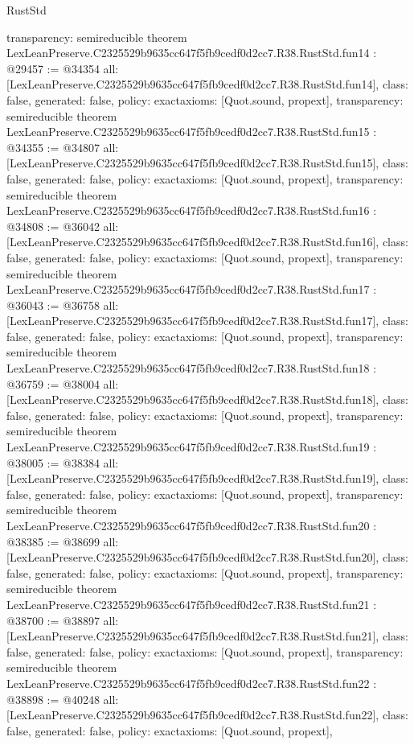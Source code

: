\begin{lexlean}{RustStd}
\begin{coremodule}
{  transparency: semireducible
}
theorem LexLeanPreserve.C2325529b9635cc647f5fb9cedf0d2cc7.R38.RustStd.fun14 : @29457 := @34354 {
  all: [LexLeanPreserve.C2325529b9635cc647f5fb9cedf0d2cc7.R38.RustStd.fun14],
  class: false,
  generated: false,
  policy: exact{axioms: [Quot.sound, propext]},
  transparency: semireducible
}
theorem LexLeanPreserve.C2325529b9635cc647f5fb9cedf0d2cc7.R38.RustStd.fun15 : @34355 := @34807 {
  all: [LexLeanPreserve.C2325529b9635cc647f5fb9cedf0d2cc7.R38.RustStd.fun15],
  class: false,
  generated: false,
  policy: exact{axioms: [Quot.sound, propext]},
  transparency: semireducible
}
theorem LexLeanPreserve.C2325529b9635cc647f5fb9cedf0d2cc7.R38.RustStd.fun16 : @34808 := @36042 {
  all: [LexLeanPreserve.C2325529b9635cc647f5fb9cedf0d2cc7.R38.RustStd.fun16],
  class: false,
  generated: false,
  policy: exact{axioms: [Quot.sound, propext]},
  transparency: semireducible
}
theorem LexLeanPreserve.C2325529b9635cc647f5fb9cedf0d2cc7.R38.RustStd.fun17 : @36043 := @36758 {
  all: [LexLeanPreserve.C2325529b9635cc647f5fb9cedf0d2cc7.R38.RustStd.fun17],
  class: false,
  generated: false,
  policy: exact{axioms: [Quot.sound, propext]},
  transparency: semireducible
}
theorem LexLeanPreserve.C2325529b9635cc647f5fb9cedf0d2cc7.R38.RustStd.fun18 : @36759 := @38004 {
  all: [LexLeanPreserve.C2325529b9635cc647f5fb9cedf0d2cc7.R38.RustStd.fun18],
  class: false,
  generated: false,
  policy: exact{axioms: [Quot.sound, propext]},
  transparency: semireducible
}
theorem LexLeanPreserve.C2325529b9635cc647f5fb9cedf0d2cc7.R38.RustStd.fun19 : @38005 := @38384 {
  all: [LexLeanPreserve.C2325529b9635cc647f5fb9cedf0d2cc7.R38.RustStd.fun19],
  class: false,
  generated: false,
  policy: exact{axioms: [Quot.sound, propext]},
  transparency: semireducible
}
theorem LexLeanPreserve.C2325529b9635cc647f5fb9cedf0d2cc7.R38.RustStd.fun20 : @38385 := @38699 {
  all: [LexLeanPreserve.C2325529b9635cc647f5fb9cedf0d2cc7.R38.RustStd.fun20],
  class: false,
  generated: false,
  policy: exact{axioms: [Quot.sound, propext]},
  transparency: semireducible
}
theorem LexLeanPreserve.C2325529b9635cc647f5fb9cedf0d2cc7.R38.RustStd.fun21 : @38700 := @38897 {
  all: [LexLeanPreserve.C2325529b9635cc647f5fb9cedf0d2cc7.R38.RustStd.fun21],
  class: false,
  generated: false,
  policy: exact{axioms: [Quot.sound, propext]},
  transparency: semireducible
}
theorem LexLeanPreserve.C2325529b9635cc647f5fb9cedf0d2cc7.R38.RustStd.fun22 : @38898 := @40248 {
  all: [LexLeanPreserve.C2325529b9635cc647f5fb9cedf0d2cc7.R38.RustStd.fun22],
  class: false,
  generated: false,
  policy: exact{axioms: [Quot.sound, propext]},
}
\end{coremodule}
\end{lexlean}
